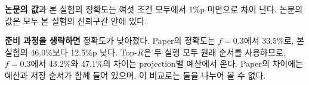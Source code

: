 \textbf{논문의 값}과 본 실험의 정확도는 여섯 조건 모두에서 1\%p 미만으로 차이 난다. 논문의 값은 모두 본 실험의 신뢰구간 안에 있다.

\textbf{준비 과정을 생략하면} 정확도가 낮아졌다. Paper의 정확도는 $f=0.3$에서 33.5\%로, 본 실험의 46.0\%보다 12.5\%p 낮다. Top-$R$은 두 실행 모두 원래 순서를 사용하므로, $f=0.3$에서 43.2\%와 47.1\%의 차이는 projection별 예산에서 온다. Paper의 차이에는 예산과 저장 순서가 함께 들어 있으며, 이 비교로는 둘을 나누어 볼 수 없다.

